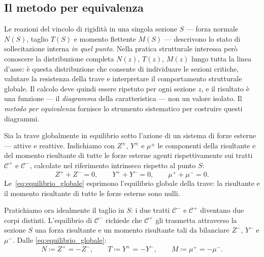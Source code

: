 \subsection{Il metodo per equivalenza}
\label{sec:caratteristiche_calcolo}

Le reazioni del vincolo di rigidità in una singola
sezione $S$ --- forza normale $N(S)$, taglio $T(S)$
e momento flettente $M(S)$ --- descrivono lo stato
di sollecitazione interna \emph{in quel punto}.
Nella pratica strutturale interessa però conoscere
la distribuzione completa $N(z)$, $T(z)$, $M(z)$
lungo tutta la linea d'asse: è questa distribuzione
che consente di individuare le sezioni critiche,
valutare la resistenza della trave e interpretare
il comportamento strutturale globale. Il calcolo
deve quindi essere ripetuto per ogni sezione $z$,
e il risultato è una funzione --- il
\emph{diagramma} della caratteristica --- non un
valore isolato. Il \emph{metodo per equivalenza}
fornisce lo strumento sistematico per costruire
questi diagrammi.


Sia la trave globalmente in equilibrio sotto l'azione
di un sistema di forze esterne --- attive e reattive.
Indichiamo con $Z^\pm$, $Y^\pm$ e $\mu^\pm$ le
componenti della risultante e del momento risultante
di tutte le forze esterne agenti rispettivamente sui
tratti $\mathcal{C}^+$ e $\mathcal{C}^-$, calcolate
nel riferimento intrinseco rispetto al punto $S$:
\begin{equation}\label{eq:equilibrio_globale}
	Z^+ + Z^- = 0, \qquad
	Y^+ + Y^- = 0, \qquad
	\mu^+ + \mu^- = 0.
\end{equation}
Le~\eqref{eq:equilibrio_globale} esprimono
l'equilibrio globale della trave: la risultante e
il momento risultante di tutte le forze esterne
sono nulli.

Pratichiamo ora idealmente il taglio in $S$:
i due tratti $\mathcal{C}^-$ e $\mathcal{C}^+$
diventano due corpi distinti. L'equilibrio di
$\mathcal{C}^-$ richiede che $\mathcal{C}^+$
gli trasmetta attraverso la sezione $S$ una forza
risultante e un momento risultante tali da
bilanciare $Z^-$, $Y^-$ e $\mu^-$. Dalle
\eqref{eq:equilibrio_globale}:
\begin{equation}\label{eq:NTM_def}
	\boxed{N \coloneqq Z^+ = -Z^-, \qquad
		T \coloneqq Y^+ = -Y^-, \qquad
		M \coloneqq \mu^+ = -\mu^-.}
\end{equation}

